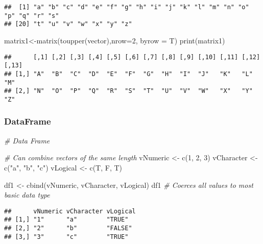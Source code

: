 \documentclass[
]{article}
\newenvironment{Shaded}{\begin{snugshade}}{\end{snugshade}}
\newcommand{\AttributeTok}[1]{\textcolor[rgb]{0.77,0.63,0.00}{#1}}
\newcommand{\CommentTok}[1]{\textcolor[rgb]{0.56,0.35,0.01}{\textit{#1}}}
\newcommand{\DecValTok}[1]{\textcolor[rgb]{0.00,0.00,0.81}{#1}}
\newcommand{\FunctionTok}[1]{\textcolor[rgb]{0.00,0.00,0.00}{#1}}
\newcommand{\NormalTok}[1]{#1}
\newcommand{\OtherTok}[1]{\textcolor[rgb]{0.56,0.35,0.01}{#1}}
\newcommand{\StringTok}[1]{\textcolor[rgb]{0.31,0.60,0.02}{#1}}
\begin{document}
\begin{verbatim}
##  [1] "a" "b" "c" "d" "e" "f" "g" "h" "i" "j" "k" "l" "m" "n" "o" "p" "q" "r" "s"
## [20] "t" "u" "v" "w" "x" "y" "z"
\end{verbatim}

\begin{Shaded}
\begin{Highlighting}[]
\NormalTok{matrix1}\OtherTok{\textless{}{-}}\FunctionTok{matrix}\NormalTok{(}\FunctionTok{toupper}\NormalTok{(vector),}\AttributeTok{nrow=}\DecValTok{2}\NormalTok{, }\AttributeTok{byrow =}\NormalTok{ T)}
\FunctionTok{print}\NormalTok{(matrix1)}
\end{Highlighting}
\end{Shaded}

\begin{verbatim}
##      [,1] [,2] [,3] [,4] [,5] [,6] [,7] [,8] [,9] [,10] [,11] [,12] [,13]
## [1,] "A"  "B"  "C"  "D"  "E"  "F"  "G"  "H"  "I"  "J"   "K"   "L"   "M"  
## [2,] "N"  "O"  "P"  "Q"  "R"  "S"  "T"  "U"  "V"  "W"   "X"   "Y"   "Z"
\end{verbatim}

\hypertarget{dataframe}{%
\subsubsection{DataFrame}\label{dataframe}}

\begin{Shaded}
\begin{Highlighting}[]
\CommentTok{\# Data Frame}

\CommentTok{\# Can combine vectors of the same length}
\NormalTok{vNumeric   }\OtherTok{\textless{}{-}} \FunctionTok{c}\NormalTok{(}\DecValTok{1}\NormalTok{, }\DecValTok{2}\NormalTok{, }\DecValTok{3}\NormalTok{)}
\NormalTok{vCharacter }\OtherTok{\textless{}{-}} \FunctionTok{c}\NormalTok{(}\StringTok{"a"}\NormalTok{, }\StringTok{"b"}\NormalTok{, }\StringTok{"c"}\NormalTok{)}
\NormalTok{vLogical   }\OtherTok{\textless{}{-}} \FunctionTok{c}\NormalTok{(T, F, T)}

\NormalTok{df1 }\OtherTok{\textless{}{-}} \FunctionTok{cbind}\NormalTok{(vNumeric, vCharacter, vLogical)}
\NormalTok{df1  }\CommentTok{\# Coerces all values to most basic data type}
\end{Highlighting}
\end{Shaded}

\begin{verbatim}
##      vNumeric vCharacter vLogical
## [1,] "1"      "a"        "TRUE"  
## [2,] "2"      "b"        "FALSE" 
## [3,] "3"      "c"        "TRUE"
\end{verbatim}
\end{document}
